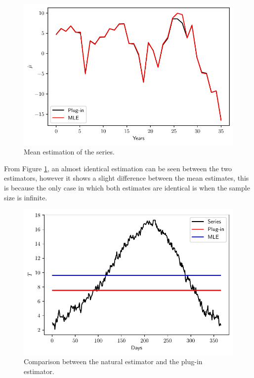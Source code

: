 \documentclass[11pt]{article}
\theoremstyle{definition}
\theoremstyle{remark}
\theoremstyle{remark}
\begin{document}
\begin{figure}[H]
    \centering
    \includegraphics[scale=.5]{../figs/means.pdf}
    \caption{Mean estimation of the series.}
    \label{fig:plug-in}
\end{figure}

From Figure \ref{fig:plug-in}, an almost identical estimation can be seen
between the two estimators, however it shows
a slight difference between the mean estimates, this is because the
only case in which both estimates are identical is when the sample
size is infinite.


\begin{figure}[H]
    \centering
    \includegraphics[scale=.5]{../figs/mle-vs-plugin.pdf}
    \caption{Comparison between the natural estimator and the plug-in estimator.}
    \label{fig:comparision}
\end{figure}
\end{document}
